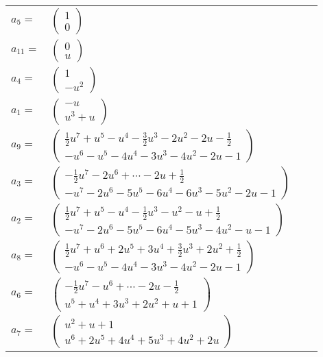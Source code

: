 \documentclass[1p]{elsarticle_modified}
\theoremstyle{definition}
\begin{document}
\begin{tabular}{m{7pt} m{180pt} m{7pt} m{180pt} }
\flushright $a_{5}=$&$\begin{pmatrix}1\\0\end{pmatrix}$ \\
\flushright $a_{11}=$&$\begin{pmatrix}0\\u\end{pmatrix}$ \\
\flushright $a_{4}=$&$\begin{pmatrix}1\\- u^2\end{pmatrix}$ \\
\flushright $a_{1}=$&$\begin{pmatrix}- u\\u^3+u\end{pmatrix}$ \\
\flushright $a_{9}=$&$\begin{pmatrix}\frac{1}{2} u^7+u^5- u^4-\frac{3}{2} u^3-2 u^2-2 u-\frac{1}{2}\\- u^6- u^5-4 u^4-3 u^3-4 u^2-2 u-1\end{pmatrix}$ \\
\flushright $a_{3}=$&$\begin{pmatrix}-\frac{1}{2} u^7-2 u^6+\cdots-2 u+\frac{1}{2}\\- u^7-2 u^6-5 u^5-6 u^4-6 u^3-5 u^2-2 u-1\end{pmatrix}$ \\
\flushright $a_{2}=$&$\begin{pmatrix}\frac{1}{2} u^7+u^5- u^4-\frac{1}{2} u^3- u^2- u+\frac{1}{2}\\- u^7-2 u^6-5 u^5-6 u^4-5 u^3-4 u^2- u-1\end{pmatrix}$ \\
\flushright $a_{8}=$&$\begin{pmatrix}\frac{1}{2} u^7+u^6+2 u^5+3 u^4+\frac{3}{2} u^3+2 u^2+\frac{1}{2}\\- u^6- u^5-4 u^4-3 u^3-4 u^2-2 u-1\end{pmatrix}$ \\
\flushright $a_{6}=$&$\begin{pmatrix}-\frac{1}{2} u^7- u^6+\cdots-2 u-\frac{1}{2}\\u^5+u^4+3 u^3+2 u^2+u+1\end{pmatrix}$ \\
\flushright $a_{7}=$&$\begin{pmatrix}u^2+u+1\\u^6+2 u^5+4 u^4+5 u^3+4 u^2+2 u\end{pmatrix}$ \\

\end{tabular}
\end{document}
